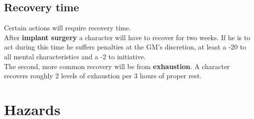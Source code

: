 \documentclass[12pt,a4paper,openany]{book}
\begin{document}
	\section{Recovery time}
	Certain actions will require recovery time.\\
	After \textbf{implant surgery} a character will have to recover for two weeks. If he is to act during this time he suffers penalties at the GM’s discretion, at least a -20 to all mental characteristics and a -2 to initiative.\\
	The second, more common recovery will be from \textbf{exhaustion}. A character recovers roughly 2 levels of exhaustion per 3 hours of proper rest.

	\chapter{Hazards}
\end{document}
